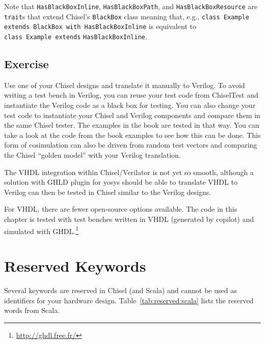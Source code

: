 \documentclass[%
    10pt,
    headinclude, footinclude=false,
    openright, %
    notitlepage,
    cleardoublepage=empty,
    headsepline,
    numbers=noenddot,
    bibliography=totoc, index=totoc,
    ]{scrbook}
\newcommand{\code}[1]{{\lstinline[basicstyle=\small\ttfamily]{#1}}}
\begin{document}
Note that \code{HasBlackBoxInline}, \code{HasBlackBoxPath}, and \code{HasBlackBoxResource}
are \code{trait}s that extend Chisel's \code{BlackBox} class meaning that, e.g.,
\code{class Example extends BlackBox with HasBlackBoxInline} is equivalent to\\
\code{class Example extends} \code{HasBlackBoxInline}.

\section{Exercise}

Use one of your Chisel designs and translate it manually to Verilog.
To avoid writing a test bench in Verilog, you can reuse your test code from
ChiselTest and instantiate the Verilog code as a black box for testing.
You can also change your test code to instantiate your Chisel and Verilog components
and compare them in the same Chisel tester.
The examples in the book are tested in that way. You can take a look at the
code from the book examples to see how this can be done.
This form of cosimulation can also be driven from random test vectors
and comparing the Chisel ``golden model'' with your Verilog translation.

The VHDL integration within Chisel/Verilator is not yet so smooth, although
a solution with GHLD plugin for yosys should be able to translate VHDL to
Verilog can then be tested in Chisel similar to the Verilog designs.

For VHDL, there are fewer open-source options available.
The code in this chapter is tested with test benches written in VHDL (generated
by copilot) and simulated with GHDL.\footnote{\url{http://ghdl.free.fr/}}

\chapter{Reserved Keywords}
\label{sec:reserved}

Several keywords are reserved in Chisel (and Scala) and cannot be used as identifiers
for your hardware design.
Table~\ref{tab:reserved:scala} lists the reserved words from Scala.
\end{document}
